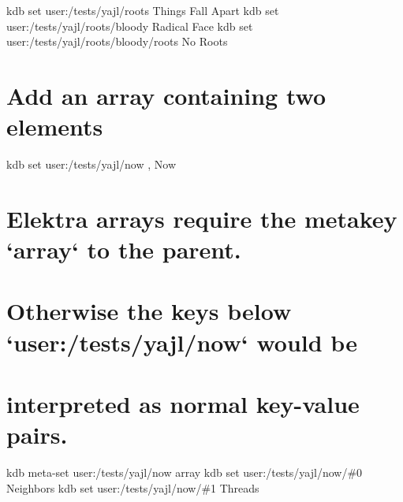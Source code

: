 kdb set user\+:/tests/yajl/roots \textquotesingle{}Things Fall Apart\textquotesingle{} kdb set user\+:/tests/yajl/roots/bloody \textquotesingle{}Radical Face\textquotesingle{} kdb set user\+:/tests/yajl/roots/bloody/roots \textquotesingle{}No Roots\textquotesingle{}\hypertarget{autotoc_md777_autotoc_md797}{}\section{Add an array containing two elements}\label{autotoc_md777_autotoc_md797}
kdb set user\+:/tests/yajl/now \textquotesingle{}, Now\textquotesingle{} \hypertarget{autotoc_md777_autotoc_md798}{}\section{Elektra arrays require the metakey `array` to the parent.}\label{autotoc_md777_autotoc_md798}
\hypertarget{autotoc_md777_autotoc_md799}{}\section{Otherwise the keys below `user\+:/tests/yajl/now` would be}\label{autotoc_md777_autotoc_md799}
\hypertarget{autotoc_md777_autotoc_md800}{}\section{interpreted as normal key-\/value pairs.}\label{autotoc_md777_autotoc_md800}
kdb meta-\/set user\+:/tests/yajl/now array \textquotesingle{}\textquotesingle{} kdb set user\+:/tests/yajl/now/\#0 \textquotesingle{}Neighbors\textquotesingle{} kdb set user\+:/tests/yajl/now/\#1 \textquotesingle{}Threads\textquotesingle{}

